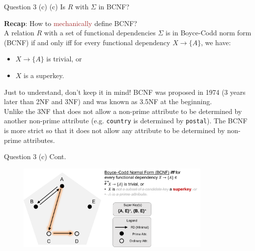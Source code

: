 \begin{frame}[fragile]{Question 3 (c)}
(c) Is $R$ with $\Sigma$ in BCNF?\\\vspace{10pt}

\textbf{Recap}: How to \textcolor{brown}{mechanically} define BCNF?\\\vspace{10pt}
A relation $R$ with a set of functional dependencies $\Sigma$ is in Boyce-Codd norm form (BCNF) if and only iff for every functional dependency $X\rightarrow\{A\}$, we have:
\begin{itemize}
	\item $X\rightarrow\{A\}$ is trivial, or
	\item $X$ is a superkey.
\end{itemize}\vspace{3pt}

\begin{alertblock}{Just to understand, don't keep it in mind!}
BCNF was proposed in 1974 (3 years later than 2NF and 3NF) and was known as 3.5NF at the beginning.\\
Unlike the 3NF that does not allow a non-prime attribute to be determined by another non-prime attribute (e.g. \texttt{country} is determined by \texttt{postal}). 
The BCNF is more strict so that it does not allow any attribute to be determined by non-prime attributes.
\end{alertblock}

\end{frame}

\begin{frame}[fragile]{Question 3 (c) Cont.}
\begin{figure}
	\includegraphics[width=0.85\textwidth, trim=0 0 0 0, clip]{t5/images/q3_bcnf_highlight.png}
\end{figure}
\end{frame}

